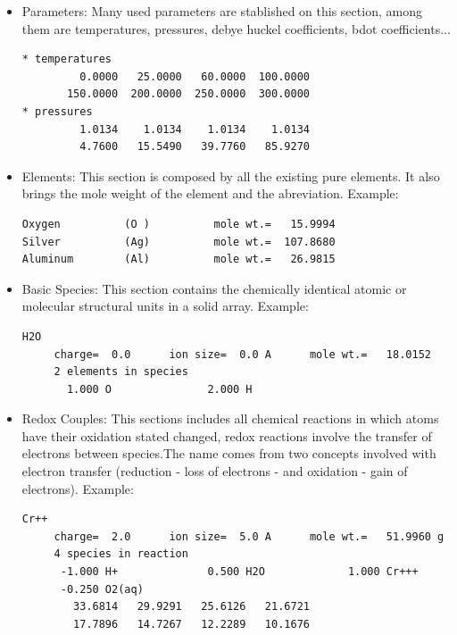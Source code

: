 \documentclass[ppgc,mestrado,English]{iiufrgs}
\begin{document}
\begin{itemize}
\item Parameters: Many used parameters are stablished on this section, among them are temperatures, pressures, debye huckel coefficients, bdot coefficients...
\begin{lstlisting}[frame=single, caption=Excerpt of the section Parameters]
* temperatures
         0.0000   25.0000   60.0000  100.0000
       150.0000  200.0000  250.0000  300.0000
* pressures
         1.0134    1.0134    1.0134    1.0134
         4.7600   15.5490   39.7760   85.9270
\end{lstlisting}
\item Elements: This section is composed by all the existing pure elements. It also brings the mole weight of the element and the abreviation. Example: 
\begin{lstlisting}[frame=single, caption=Excerpt of the section Elements]
Oxygen          (O )          mole wt.=   15.9994
Silver          (Ag)          mole wt.=  107.8680
Aluminum        (Al)          mole wt.=   26.9815
\end{lstlisting}
\item Basic Species: This section contains the chemically identical atomic or molecular structural units in a solid array. Example:
\begin{lstlisting}[frame=single, caption=Excerpt of the section Basic Species]
H2O
     charge=  0.0      ion size=  0.0 A      mole wt.=   18.0152
     2 elements in species
       1.000 O               2.000 H
\end{lstlisting}

\item Redox Couples: This sections includes all chemical reactions in which atoms have their oxidation stated changed, redox reactions involve the transfer of electrons between species.The name comes from two concepts involved with electron transfer (reduction - loss of electrons - and oxidation - gain of electrons). Example:

\begin{minipage}[c]{0.93\textwidth}
\begin{lstlisting}[frame=single, caption=Excerpt of the section Redox Couples]
Cr++
     charge=  2.0      ion size=  5.0 A      mole wt.=   51.9960 g
     4 species in reaction
      -1.000 H+              0.500 H2O             1.000 Cr+++
      -0.250 O2(aq)
        33.6814   29.9291   25.6126   21.6721
        17.7896   14.7267   12.2289   10.1676
\end{lstlisting}
\end{minipage}


\end{itemize}
\end{document}
